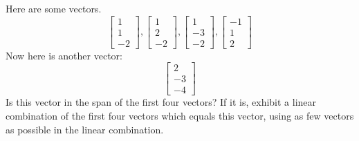 \documentclass{ximera}
\begin{document}
\begin{problem}\label{prb:3.9} Here are some vectors.
\begin{equation*}
\left[
\begin{array}{r}
1 \\
1 \\
-2
\end{array}
\right] ,\left[
\begin{array}{r}
1 \\
2 \\
-2
\end{array}
\right] ,\left[
\begin{array}{r}
1 \\
-3 \\
-2
\end{array}
\right] ,\left[
\begin{array}{r}
-1 \\
1 \\
2
\end{array}
\right]
\end{equation*}
Now here is another vector:\
\begin{equation*}
\left[
\begin{array}{r}
2 \\
-3 \\
-4
\end{array}
\right]
\end{equation*}
Is this vector in the span of the first four vectors? If it is, exhibit a
linear combination of the first four vectors which equals this vector, using
as few vectors as possible in the linear combination.
\end{problem}
\end{document}

